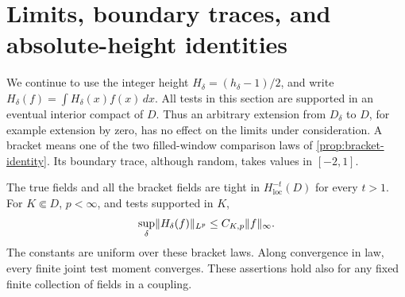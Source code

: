 \section{Limits, boundary traces, and absolute-height identities}
\label{sec:limits}

We continue to use the integer height $H_\delta=(h_\delta-1)/2$,
and write $H_\delta(f)=\int H_\delta(x)f(x)\,dx$. All tests in this
section are supported in an eventual interior compact of $D$. Thus an
arbitrary extension from $D_\delta$ to $D$, for example extension by zero,
has no effect on the limits under consideration. A bracket means one of
the two filled-window comparison laws of
\cref{prop:bracket-identity}. Its boundary trace, although random, takes
values in $[-2,1]$.

\begin{proposition}
\label{prop:tightness}
The true fields and all the bracket fields are tight in
$H^{-t}_{\mathrm{loc}}(D)$ for every $t>1$. For $K\Subset D$, $p<\infty$,
and tests supported in $K$,
\begin{equation}
 \sup_\delta\lVert H_\delta(f)\rVert_{L^p}
       \le C_{K,p}\lVert f\rVert_{\infty}.
 \label{eq:local-test-moments}
\end{equation}
The constants are uniform over these bracket laws. Along convergence in
law, every finite joint test moment converges. These assertions hold
also for any fixed finite collection of fields in a coupling.
\end{proposition}

